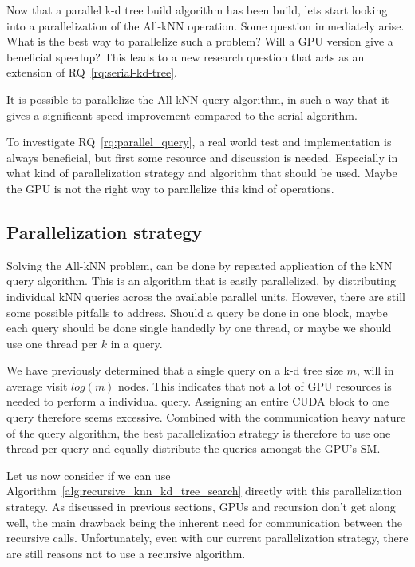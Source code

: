 Now that a parallel k-d tree build algorithm has been build, lets start looking into a parallelization of the All-kNN operation. Some question immediately arise. What is the best way to parallelize such a problem? Will a GPU version give a beneficial speedup? This leads to a new research question that acts as an extension of RQ~\ref{rq:serial-kd-tree}.

\begin{myrq}
\label{rq:parallel_query}
    It is possible to parallelize the All-kNN query algorithm, in such a way that it gives a significant speed improvement compared to the serial algorithm.
\end{myrq}

To investigate RQ~\ref{rq:parallel_query}, a real world test and implementation is always beneficial, but first some resource and discussion is needed. Especially in what kind of parallelization strategy and algorithm that should be used. Maybe the GPU is not the right way to parallelize this kind of operations.

\subsection{Parallelization strategy} %
\label{sub:parallelization_strategy}

Solving the All-kNN problem, can be done by repeated application of the kNN query algorithm. This is an algorithm that is easily parallelized, by distributing individual kNN queries across the available parallel units. However, there are still some possible pitfalls to address. Should a query be done in one block, maybe each query should be done single handedly by one thread, or maybe we should use one thread per $k$ in a query.

We have previously determined that a single query on a k-d tree size $m$, will in average visit $log(m)$ nodes. This indicates that not a lot of GPU resources is needed to perform a individual query. Assigning an entire CUDA block to one query therefore seems excessive. Combined with the communication heavy nature of the query algorithm, the best parallelization strategy is therefore to use one thread per query and equally distribute the queries amongst the GPU's SM\@.

Let us now consider if we can use Algorithm~\ref{alg:recursive_knn_kd_tree_search} directly with this parallelization strategy. As discussed in previous sections, GPUs and recursion don't get along well, the main drawback being the inherent need for communication between the recursive calls. Unfortunately, even with our current parallelization strategy, there are still reasons not to use a recursive algorithm. 

